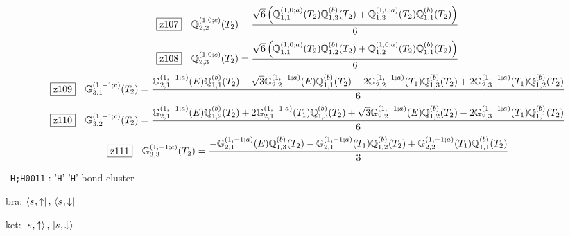 \documentclass[fleqn,10pt,landscape]{jsarticle}
\begin{document}
\begin{dmath*}
\hspace*{3mm}\fbox{z107}\quad \mathbb{Q}_{2,2}^{(1,0;c)}(T_{2})=\frac{\sqrt{6} \left(\mathbb{Q}_{1,1}^{(1,0;a)}(T_{2}) \mathbb{Q}_{1,3}^{(b)}(T_{2}) + \mathbb{Q}_{1,3}^{(1,0;a)}(T_{2}) \mathbb{Q}_{1,1}^{(b)}(T_{2})\right)}{6}
\end{dmath*}
\begin{dmath*}
\hspace*{3mm}\fbox{z108}\quad \mathbb{Q}_{2,3}^{(1,0;c)}(T_{2})=\frac{\sqrt{6} \left(\mathbb{Q}_{1,1}^{(1,0;a)}(T_{2}) \mathbb{Q}_{1,2}^{(b)}(T_{2}) + \mathbb{Q}_{1,2}^{(1,0;a)}(T_{2}) \mathbb{Q}_{1,1}^{(b)}(T_{2})\right)}{6}
\end{dmath*}
\begin{dmath*}
\hspace*{3mm}\fbox{z109}\quad \mathbb{G}_{3,1}^{(1,-1;c)}(T_{2})=\frac{\mathbb{G}_{2,1}^{(1,-1;a)}(E) \mathbb{Q}_{1,1}^{(b)}(T_{2}) - \sqrt{3} \mathbb{G}_{2,2}^{(1,-1;a)}(E) \mathbb{Q}_{1,1}^{(b)}(T_{2}) - 2 \mathbb{G}_{2,2}^{(1,-1;a)}(T_{1}) \mathbb{Q}_{1,3}^{(b)}(T_{2}) + 2 \mathbb{G}_{2,3}^{(1,-1;a)}(T_{1}) \mathbb{Q}_{1,2}^{(b)}(T_{2})}{6}
\end{dmath*}
\begin{dmath*}
\hspace*{3mm}\fbox{z110}\quad \mathbb{G}_{3,2}^{(1,-1;c)}(T_{2})=\frac{\mathbb{G}_{2,1}^{(1,-1;a)}(E) \mathbb{Q}_{1,2}^{(b)}(T_{2}) + 2 \mathbb{G}_{2,1}^{(1,-1;a)}(T_{1}) \mathbb{Q}_{1,3}^{(b)}(T_{2}) + \sqrt{3} \mathbb{G}_{2,2}^{(1,-1;a)}(E) \mathbb{Q}_{1,2}^{(b)}(T_{2}) - 2 \mathbb{G}_{2,3}^{(1,-1;a)}(T_{1}) \mathbb{Q}_{1,1}^{(b)}(T_{2})}{6}
\end{dmath*}
\begin{dmath*}
\hspace*{3mm}\fbox{z111}\quad \mathbb{G}_{3,3}^{(1,-1;c)}(T_{2})=\frac{- \mathbb{G}_{2,1}^{(1,-1;a)}(E) \mathbb{Q}_{1,3}^{(b)}(T_{2}) - \mathbb{G}_{2,1}^{(1,-1;a)}(T_{1}) \mathbb{Q}_{1,2}^{(b)}(T_{2}) + \mathbb{G}_{2,2}^{(1,-1;a)}(T_{1}) \mathbb{Q}_{1,1}^{(b)}(T_{2})}{3}
\end{dmath*}
\vspace{5mm}

\noindent\textbullet\, \texttt{H;H\texttt{}001\texttt{}1} : '\texttt{H}'-'\texttt{H}' bond-cluster

\noindent\quad * bra: $\bra{s_{},\uparrow},\, \bra{s_{},\downarrow}$

\noindent\quad * ket: $\ket{s_{},\uparrow},\, \ket{s_{},\downarrow}$
\end{document}
